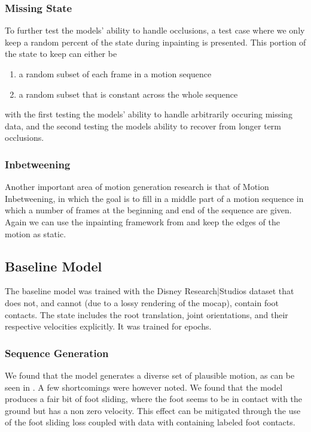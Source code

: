 \subsubsection{Missing State}
To further test the models' ability to handle occlusions, a test case where we only keep a random percent of the state during inpainting is presented. This portion of the state to keep can either be 
\begin{enumerate}
    \item a random subset of each frame in a motion sequence
    \item a random subset that is constant across the whole sequence
\end{enumerate}
with the first testing the models' ability to handle arbitrarily occuring missing data, and the second testing the models ability to recover from longer term occlusions.

\subsubsection{Inbetweening}
Another important area of motion generation research is that of Motion Inbetweening, in which the goal is to fill in a middle part of a motion sequence in which a number of frames at the beginning and end of the sequence are given. Again we can use the inpainting framework from  and keep the edges of the motion as static.


\subsection{Baseline Model}
\label{sec:baseline_evaluation}
The baseline model was trained with the Disney Research|Studios dataset that does not, and cannot (due to a lossy rendering of the mocap), contain foot contacts. The state includes the root translation, joint orientations, and their respective velocities explicitly. It was trained for  epochs. 

\subsubsection{Sequence Generation}
We found that the model generates a diverse set of plausible motion, as can be seen in . A few shortcomings were however noted. We found that the model produces a fair bit of foot sliding, where the foot seems to be in contact with the ground but has a non zero velocity. This effect can be mitigated through the use of the foot sliding loss coupled with data with containing labeled foot contacts.

